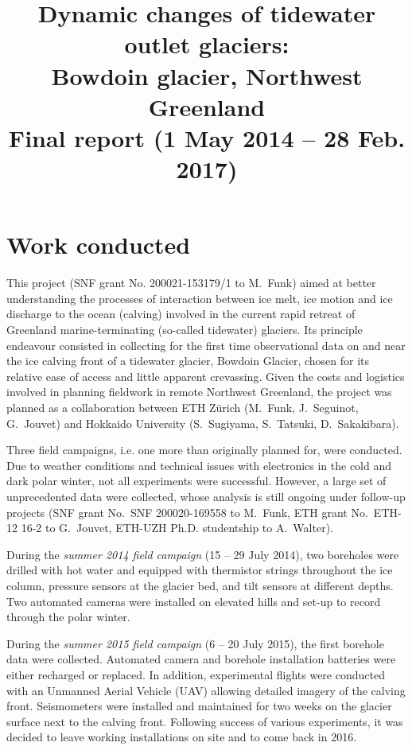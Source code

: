 \documentclass{article}
\title{Dynamic changes of tidewater outlet glaciers:\\
       Bowdoin glacier, Northwest Greenland\\\bigskip
       \large Final report (1 May 2014 -- 28 Feb. 2017)}
\author{}
\date{}
\begin{document}

\maketitle

\section{Work conducted}

This project (SNF grant No. 200021-153179/1 to M.~Funk) aimed at better
understanding the processes of interaction between ice melt, ice motion and ice
discharge to the ocean (calving) involved in the current rapid retreat of
Greenland marine-terminating (so-called tidewater) glaciers. Its principle
endeavour consisted in collecting for the first time observational data on and
near the ice calving front of a tidewater glacier, Bowdoin Glacier, chosen for
its relative ease of access and little apparent crevassing. Given the costs and
logistics involved in planning fieldwork in remote Northwest Greenland, the
project was planned as a collaboration between ETH Zürich (M.~Funk,
J.~Seguinot, G.~Jouvet) and Hokkaido University (S.~Sugiyama, S.~Tatsuki,
D.~Sakakibara).

Three field campaigns, i.e. one more than originally planned for, were
conducted. Due to weather conditions and technical issues with electronics in
the cold and dark polar winter, not all experiments were successful. However, a
large set of unprecedented data were collected, whose analysis is still ongoing
under follow-up projects (SNF grant No.~SNF 200020-169558 to M.~Funk, ETH grant
No.~ETH-12 16-2 to G.~Jouvet, ETH-UZH Ph.D. studentship to A.~Walter).

During the \emph{summer 2014 field campaign} (15 -- 29 July 2014), two
boreholes were drilled with hot water and equipped with thermistor strings
throughout the ice column, pressure sensors at the glacier bed, and
tilt sensors at different depths. Two automated cameras were installed on
elevated hills and set-up to record through the polar winter.

During the \emph{summer 2015 field campaign} (6 -- 20 July 2015), the first
borehole data were collected. Automated camera and borehole installation
batteries were either recharged or replaced. In addition, experimental flights
were conducted with an Unmanned Aerial Vehicle (UAV) allowing detailed imagery
of the calving front. Seismometers were installed and maintained for two weeks
on the glacier surface next to the calving front. Following success of various
experiments, it was decided to leave working installations on site and to come
back in 2016.
\end{document}
